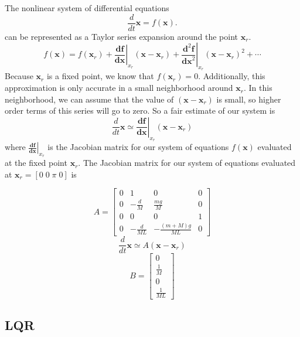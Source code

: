 \documentclass[]{article}
\newcommand{\bx}{\boldsymbol{x}}
\begin{document}
The nonlinear system of differential equations
\begin{equation}
		\frac{d}{dt} \bx = f(\bx).
\end{equation}
can be represented as a Taylor series expansion around the point $\bx_r$.
\begin{equation}
	 f(\bx) = f(\bx_r) +\left.  \frac{\boldsymbol{df}}{\boldsymbol{dx}} \right|_{x_r}(\bx -\bx_r) + \left. \frac{\boldsymbol{d}^2\boldsymbol{f}}{\boldsymbol{dx}^2} \right|_{x_r}(\bx -\bx_r)^2 + \cdots
\end{equation}
Because $\bx_r$ is a fixed point, we know that $f(\bx_r) = 0$. Additionally, this approximation is only accurate in a small neighborhood around $\bx_r$.  In this neighborhood, we can assume that the value of $(\bx -\bx_r)$ is small, so higher order terms of this series will go to zero. So a fair estimate of our system is
\begin{equation}
	\frac{d}{dt} \bx \simeq \left.  \frac{\boldsymbol{df}}{\boldsymbol{dx}} \right|_{x_r}(\bx -\bx_r) 
\end{equation}
where $\left.  \frac{\boldsymbol{df}}{\boldsymbol{dx}} \right|_{x_r}$ is the Jacobian matrix for our system of equations $f(\bx)$ evaluated at the fixed point $\bx_r$. The Jacobian matrix for our system of equations evaluated at $\bx_r = [0\; 0\; \pi \; 0]$ is 

	\begin{equation}
		A = 
	\begin{bmatrix}
		0 & 1              & 0                          & 0 \\
		0 & -\frac{d}{M}      & \frac{mg}{M}                 & 0 \\
		0 & 0              & 0                          & 1 \\
		0 & -\frac{d}{ML} & -\frac{(m+M)g}{ML} & 0
	\end{bmatrix}
\end{equation}
\begin{equation*}
	\frac{d}{dt} \bx \simeq A(\bx -\bx_r)
\end{equation*}
\begin{equation}
	B = 
	\begin{bmatrix}
		0 \\
		\frac{1}{M}  \\
		0  \\
		\frac{1}{ML}   
	\end{bmatrix}
\end{equation}
\subsection*{LQR}
\end{document}
